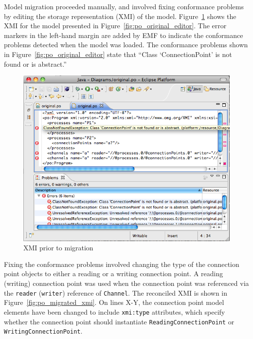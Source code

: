
Model migration proceeded manually, and involved fixing conformance problems by editing the storage representation (XMI) of the model. Figure~\ref{fig:po_original_xmi} shows the XMI for the model presented in Figure~\ref{fig:po_original_editor}. The error markers in the left-hand margin are added by EMF to indicate the conformance problems detected when the model was loaded. The conformance problems shown in Figure~\ref{fig:po_original_editor} state that ``Class `ConnectionPoint' is not found or is abstract.''

\begin{figure}[htbp]
	\centering
	\includegraphics[width=13.5cm]{6.Evaluation/images/user_driven/po_original_xmi.png}
	\caption{XMI prior to migration}
	\label{fig:po_original_xmi}
\end{figure}

Fixing the conformance problems involved changing the type of the connection point objects to either a reading or a writing connection point. A reading (writing) connection point was used when the connection point was referenced via the \texttt{reader} (\texttt{writer}) reference of \texttt{Channel}. The reconciled XMI is shown in Figure~\ref{fig:po_migrated_xmi}. On lines X-Y, the connection point model elements have been changed to include \texttt{xmi:type} attributes, which specify whether the connection point should instantiate \texttt{ReadingConnectionPoint} or \texttt{WritingConnectionPoint}.

